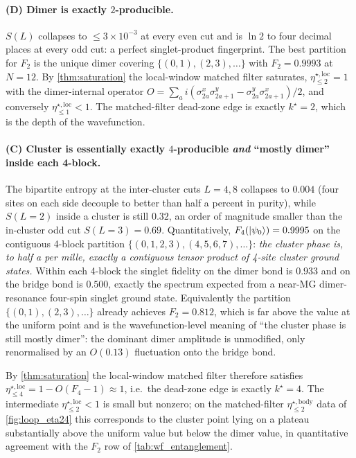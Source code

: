 \documentclass[11pt,a4paper]{article}
\newcommand{\PsiZ}{\ket{\psi_0}}
\newcommand{\etabody}[1]{\eta^{\star,\mathrm{body}}_{\le #1}}
\newcommand{\etaloc}[1]{\eta^{\star,\mathrm{loc}}_{\le #1}}
\begin{document}
\paragraph{(D) Dimer is exactly $2$-producible.}  $S(L)$ collapses
to $\le 3\times10^{-3}$ at every even cut and is $\ln 2$ to four
decimal places at every odd cut: a perfect singlet-product
fingerprint.  The best partition for $F_2$ is the unique dimer
covering $\{(0,1),(2,3),\dots\}$ with $F_2=0.9993$ at $N=12$.  By
\cref{thm:saturation} the local-window matched filter saturates,
$\etaloc{2}=1$ with the dimer-internal operator
$O=\sum_a i(\sigma^x_{2a}\sigma^y_{2a+1}-\sigma^y_{2a}\sigma^x_{2a+1})/2$,
and conversely $\etaloc{1}<1$.  The matched-filter dead-zone edge
is exactly $k^\star=2$, which is the depth of the wavefunction.

\paragraph{(C) Cluster is essentially exactly $4$-producible
\emph{and} ``mostly dimer'' inside each 4-block.}  The bipartite
entropy at the inter-cluster cuts $L=4,8$ collapses to $0.004$
(four sites on each side decouple to better than half a percent in
purity), while $S(L=2)$ inside a cluster is still $0.32$, an
order of magnitude smaller than the in-cluster odd cut
$S(L=3)=0.69$.  Quantitatively, $F_4(\PsiZ)=0.9995$ on the
contiguous 4-block partition $\{(0,1,2,3),(4,5,6,7),\dots\}$:
\emph{the cluster phase is, to half a per mille, exactly a
contiguous tensor product of 4-site cluster ground states.}
Within each 4-block the singlet fidelity on the dimer bond is
$0.933$ and on the bridge bond is $0.500$, exactly the spectrum
expected from a near-MG dimer-resonance four-spin singlet
ground state.  Equivalently the partition $\{(0,1),(2,3),\dots\}$
already achieves $F_2=0.812$, which is far above the value at
the uniform point and is the wavefunction-level meaning of ``the
cluster phase is still mostly dimer'': the dominant dimer
amplitude is unmodified, only renormalised by an $O(0.13)$
fluctuation onto the bridge bond.

By \cref{thm:saturation} the local-window matched filter therefore
satisfies $\etaloc{4}=1-O(F_4-1)\approx 1$, i.e.\ the dead-zone
edge is exactly $k^\star=4$.  The intermediate $\etaloc{2}<1$ is
small but nonzero; on the matched-filter $\etabody{2}$ data of
\cref{fig:loop_eta24} this corresponds to the cluster point lying
on a plateau substantially above the uniform value but below the
dimer value, in quantitative agreement with the
$F_2$ row of \cref{tab:wf_entanglement}.
\end{document}
